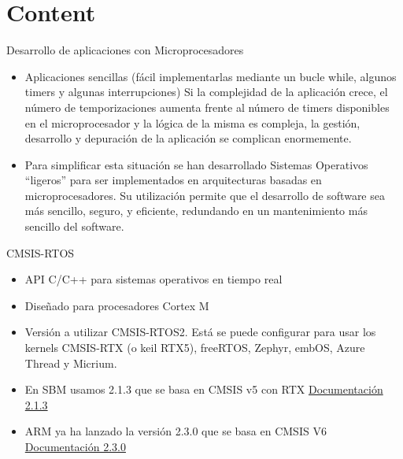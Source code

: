 \section{Content}

\begin{frame}{Desarrollo de aplicaciones con Microprocesadores}
    \begin{itemize}
        \item Aplicaciones sencillas (fácil implementarlas mediante un bucle while, algunos timers y algunas interrupciones)
Si la complejidad de la aplicación crece, el número de temporizaciones aumenta frente al número de timers disponibles en el microprocesador y la lógica de la misma es compleja, la gestión, desarrollo y depuración de la aplicación se complican enormemente.
        \item Para simplificar esta situación se han desarrollado Sistemas Operativos “ligeros” para ser implementados en arquitecturas basadas en microprocesadores. Su utilización permite que el desarrollo de software sea más sencillo, seguro, y eficiente, redundando en un mantenimiento más sencillo del software.      
    \end{itemize}
     \centering

\end{frame}


\begin{frame}{CMSIS-RTOS}
    \begin{itemize}
      \item API C/C++ para sistemas operativos en tiempo real
      \item Diseñado para procesadores Cortex M
      \item Versión a utilizar CMSIS-RTOS2. Está se puede configurar para usar los kernels CMSIS-RTX (o keil RTX5), freeRTOS, Zephyr, embOS, Azure Thread y Micrium.
      \item En SBM usamos 2.1.3 que se basa en CMSIS v5 con RTX \href{https://arm-software.github.io/CMSIS_5/RTOS2/html/index.html}{Documentación 2.1.3}
      \item ARM ya ha lanzado la versión 2.3.0 que se basa en CMSIS V6 \href{https://arm-software.github.io/CMSIS_6/latest/RTOS2/group__CMSIS__RTOS__ThreadMgmt.html}{Documentación 2.3.0}
    \end{itemize}
    
\end{frame}

